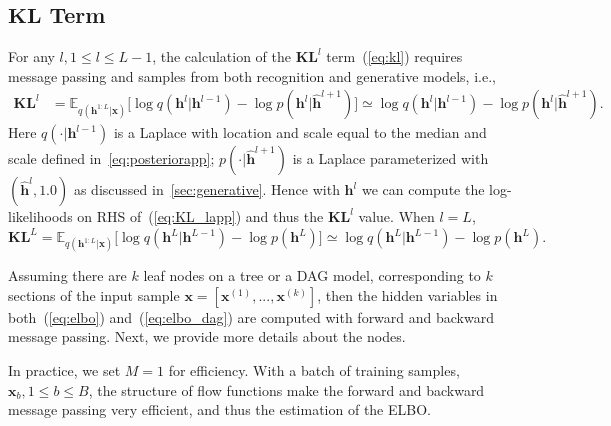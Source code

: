 \documentclass{article}
\begin{document}
\subsection{$\mathbf{KL}$ Term}
For any $l,  1 \leq l \leq L-1$, the calculation of the $\mathbf{KL}^l$ term~(\ref{eq:kl}) requires  message passing and samples  from both recognition and  generative models, i.e.,
\begin{align}\label{eq:KL_lapp}
\mathbf{KL}^l&=\mathbb{E}_{q(\mathbf{h}^{1:L}|\mathbf{x})}\big[  \log q(\mathbf{h}^{l}|\mathbf{h}^{l-1})   - \log p(\mathbf{h}^{l}|\widehat{\mathbf{h}}^{l+1}) \big] \simeq  \log q(\mathbf{h}^{l}|\mathbf{h}^{l-1})   - \log p(\mathbf{h}^{l}|\widehat{\mathbf{h}}^{l+1}).
\end{align} 
Here $q(\cdot|\mathbf{h}^{l-1})$ is a Laplace with location and scale equal to the median and scale defined in~\eqref{eq:posteriorapp}; $p(\cdot|\widehat{\mathbf{h}}^{l+1})$ is a  Laplace parameterized  with  $(\widehat{\mathbf{h}}^{l}, 1.0)$ as discussed in~\ref{sec:generative}. Hence with $\mathbf{h}^{l}$ we can compute the log-likelihoods on RHS of~(\ref{eq:KL_lapp}) and thus the $\mathbf{KL}^l$ value. When $l=L$, 
$\mathbf{KL}^L =  \mathbb{E}_{q(\mathbf{h}^{1:L}|\mathbf{x})}\big[  \log q(\mathbf{h}^{L}|\mathbf{h}^{L-1})- \log p(\mathbf{h}^{L})  \big] \simeq \log q(\mathbf{h}^{L}|\mathbf{h}^{L-1})- \log p(\mathbf{h}^{L}) .$


 
Assuming there are $k$ leaf nodes on a tree or a DAG model, corresponding to $k$ sections of the input sample $\mathbf{x} = [\mathbf{x}^{(1)}, ..., \mathbf{x}^{(k)}]$, then the hidden variables in both~(\ref{eq:elbo}) and~(\ref{eq:elbo_dag}) are computed with forward and backward message passing. 
Next, we provide more details about the nodes.

In practice, we set $M=1$ for efficiency. With a batch of training samples, $\mathbf{x}_b, 1 \leqslant b \leqslant B$, the structure of flow functions make the  forward  and  backward message passing very efficient, and  thus the estimation of the ELBO.  
\end{document}
